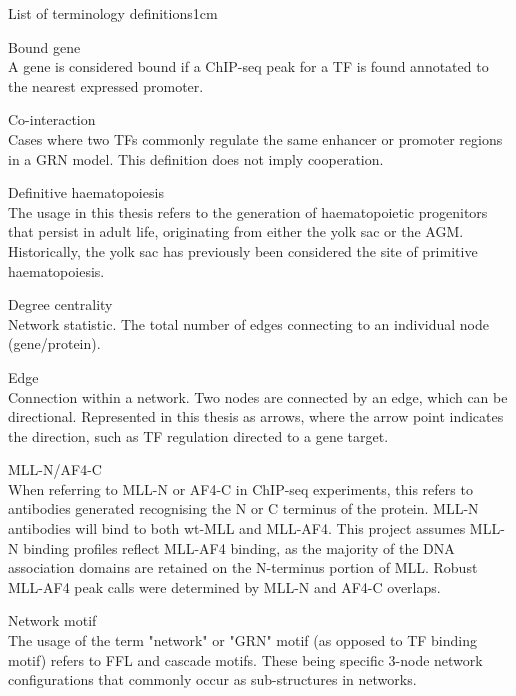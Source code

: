 \begin{mclistof}{List of terminology definitions}{1cm}

\item[Bound gene] \hfill \\ A gene is considered bound if a ChIP-seq peak for a TF is found annotated to the nearest expressed promoter.

\item[Co-interaction] \hfill \\  Cases where two TFs commonly regulate the same enhancer or promoter regions in a GRN model. This definition does not imply cooperation.

\item[Definitive haematopoiesis] \hfill \\  The usage in this thesis refers to the generation of haematopoietic progenitors that persist in adult life, originating from either the yolk sac or the AGM. Historically, the yolk sac has previously been considered the site of primitive haematopoiesis. 

\item[Degree centrality] \hfill \\  Network statistic. The total number of edges connecting to an individual node (gene/protein).

\item[Edge] \hfill \\  Connection within a network. Two nodes are connected by an edge, which can be directional. Represented in this thesis as arrows, where the arrow point indicates the direction, such as TF regulation directed to a gene target.

\item[MLL-N/AF4-C] \hfill \\  When referring to MLL-N or AF4-C in ChIP-seq experiments, this refers to antibodies generated recognising the N or C terminus of the protein. MLL-N antibodies will bind to both wt-MLL and MLL-AF4. This project assumes MLL-N binding profiles reflect MLL-AF4 binding, as the majority of the DNA association domains are retained on the N-terminus portion of MLL. Robust MLL-AF4 peak calls were determined by MLL-N and AF4-C overlaps.

\item[Network motif] \hfill \\  The usage of the term "network" or "GRN" motif (as opposed to TF binding motif) refers to FFL and cascade motifs. These being specific 3-node network configurations that commonly occur as sub-structures in networks.


\end{mclistof}
